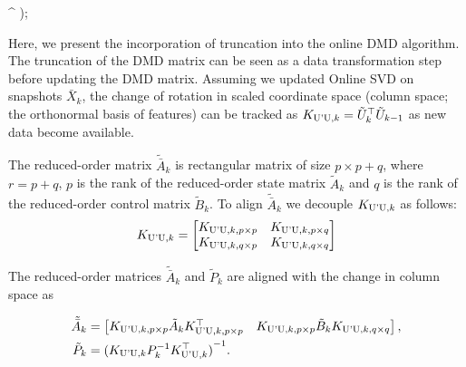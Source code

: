\begin{algorithm}[H]
\begin{algorithmic}[1]
{\begin{bmatrix}
            \end{bmatrix}^\top
            \right)\);
        }
        \ENDIF{}
    \end{algorithmic}
\end{algorithm}

Here, we present the incorporation of truncation into the online DMD algorithm. The truncation of the DMD matrix can be seen as a data transformation step before updating the DMD matrix. Assuming we updated Online SVD on snapshots \(\bar{X}_k\),
the change of rotation in scaled coordinate space (column space; the orthonormal basis of features) can be tracked as \(K _{\text{U'U}, k} = \tilde{U}_k^\top \tilde{U}_{k-1}\) as new data become available.

The reduced-order matrix \(\tilde{\bar{A}}_k\) is rectangular matrix of size \(p \times p + q\), where \(r = p + q\), \(p\) is the rank of the reduced-order state matrix \(\tilde{A}_k\) and \(q\) is the rank of the reduced-order control matrix \(\tilde{B}_k\). To align \(\tilde{\bar{A}}_k\) we decouple \(K _{\text{U'U}, k}\) as follows:
\begin{equation}
    K _{\text{U'U}, k} = \begin{bmatrix}
        K _{\text{U'U}, k, p \times p} & K _{\text{U'U}, k, p \times q} \\
        K _{\text{U'U}, k, q \times p} & K _{\text{U'U}, k, q \times q}
    \end{bmatrix}
\end{equation}

The reduced-order matrices \(\tilde{\bar{A}}_k\) and \(\tilde{P}_k\) are aligned with the change in column space as

\begin{align}
    \tilde{\bar{A}}_k & = \begin{bmatrix} K _{\text{U'U}, k, p \times p} \tilde{A}_k K _{\text{U'U}, k, p \times p}^\top & K _{\text{U'U}, k, p \times p} \tilde{B}_k K _{\text{U'U}, k, q \times q} \end{bmatrix} , \\
    \tilde{P}_k       & = {(K _{\text{U'U}, k} P_k^{-1} K _{\text{U'U}, k}^\top)}^{-1}.
\end{align}

